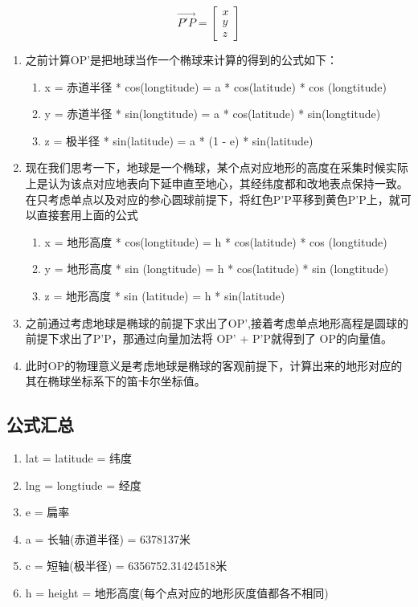 \begin{equation}
	\overrightarrow{P'P} = \begin{bmatrix} x \\[0.3em] y \\[0.3em] z  \end{bmatrix} 
\end{equation}
\begin{enumerate}
	\item 之前计算OP'是把地球当作一个椭球来计算的得到的公式如下：
	\begin{enumerate}
		\item x = 赤道半径 * cos(longtitude) = a * cos(latitude) * cos (longtitude)
		\item y = 赤道半径 * sin(longtitude) = a * cos(latitude) * sin(longtitude)
		\item z = 极半径 * sin(latitude) = a * (1 - e) * sin(latitude)
	\end{enumerate}
	\item 现在我们思考一下，地球是一个椭球，某个点对应地形的高度在采集时候实际上是认为该点对应地表向下延申直至地心，其经纬度都和改地表点保持一致。在只考虑单点以及对应的参心圆球前提下，将红色P'P平移到黄色P'P上，就可以直接套用上面的公式
	\begin{enumerate}
		\item x = 地形高度 * cos(longtitude)  = h * cos(latitude) * cos (longtitude)
		\item y = 地形高度 * sin (longtitude)  = h * cos(latitude) * sin (longtitude)
		\item z = 地形高度 * sin (latitude)       = h * sin(latitude)
	\end{enumerate}
	\item 之前通过考虑地球是椭球的前提下求出了OP',接着考虑单点地形高程是圆球的前提下求出了P'P，那通过向量加法将 OP' + P'P就得到了  OP的向量值。
	\item 此时OP的物理意义是考虑地球是椭球的客观前提下，计算出来的地形对应的其在椭球坐标系下的笛卡尔坐标值。
\end{enumerate}

\subsection{公式汇总}
\begin{enumerate}
	\item lat = latitude = 纬度
	\item lng = longtiude = 经度
	\item e = 扁率
	\item a = 长轴(赤道半径) = 6378137米
	\item c = 短轴(极半径) = 6356752.31424518米
	\item h = height = 地形高度(每个点对应的地形灰度值都各不相同)
\end{enumerate}

